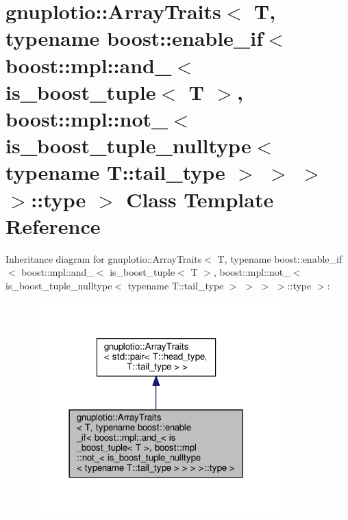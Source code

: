 \hypertarget{classgnuplotio_1_1_array_traits_3_01_t_00_01typename_01boost_1_1enable__if_3_01boost_1_1mpl_1_1a8de3a8fe198d85f7f5d28b9a2f5bf229}{}\section{gnuplotio\+:\+:Array\+Traits$<$ T, typename boost\+:\+:enable\+\_\+if$<$ boost\+:\+:mpl\+:\+:and\+\_\+$<$ is\+\_\+boost\+\_\+tuple$<$ T $>$, boost\+:\+:mpl\+:\+:not\+\_\+$<$ is\+\_\+boost\+\_\+tuple\+\_\+nulltype$<$ typename T\+:\+:tail\+\_\+type $>$ $>$ $>$ $>$\+:\+:type $>$ Class Template Reference}
\label{classgnuplotio_1_1_array_traits_3_01_t_00_01typename_01boost_1_1enable__if_3_01boost_1_1mpl_1_1a8de3a8fe198d85f7f5d28b9a2f5bf229}


Inheritance diagram for gnuplotio\+:\+:Array\+Traits$<$ T, typename boost\+:\+:enable\+\_\+if$<$ boost\+:\+:mpl\+:\+:and\+\_\+$<$ is\+\_\+boost\+\_\+tuple$<$ T $>$, boost\+:\+:mpl\+:\+:not\+\_\+$<$ is\+\_\+boost\+\_\+tuple\+\_\+nulltype$<$ typename T\+:\+:tail\+\_\+type $>$ $>$ $>$ $>$\+:\+:type $>$\+:
\nopagebreak
\begin{figure}[H]
\begin{center}
\leavevmode
\includegraphics[width=270pt]{classgnuplotio_1_1_array_traits_3_01_t_00_01typename_01boost_1_1enable__if_3_01boost_1_1mpl_1_1a1581fe615c30084043274cbfdd41a619}
\end{center}
\end{figure}


